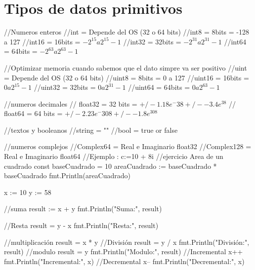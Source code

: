 \documentclass{article}
\begin{document}
\section{Tipos de datos primitivos} 
//Numeros enteros
//int = Depende del OS (32 o 64 bits)
//int8 = 8bits = -128 a 127
//int16 = 16bits = $-2^15 a 2^15-1$
//int32 = 32bits = $-2^31 a 2^31-1$
//int64 = 64bits = $-2^63 a 2^63-1$

//Optimizar memoria cuando sabemos que el dato simpre va ser positivo
//uint = Depende del OS (32 o 64 bits)
//uint8 = 8bits = 0 a 127
//uint16 = 16bits = $0 a 2^15-1$
//uint32 = 32bits = $0 a 2^31-1$
//uint64 = 64bits = $0 a 2^63-1$

//numeros decimales
// float32 = 32 bits = $+/- 1.18e^-38 +/- -3.4e^38$
// float64 = 64 bits = $+/- 2.23e^-308 +/- -1.8e^308$

//textos y booleanos
//string = ""
//bool = true or false

//numeros complejos
//Complex64 = Real e Imaginario float32
//Complex128 = Real e Imaginario float64
//Ejemplo : c:=10 + 8i
//ejercicio Area de un cuadrado
	const baseCuadrado = 10
	areaCuadrado := baseCuadrado * baseCuadrado
	fmt.Println(areaCuadrado)

	x := 10
	y := 58

	//suma
	result := x + y
	fmt.Println("Suma:", result)

	//Resta
	result = y - x
	fmt.Println("Resta:", result)

	//multiplicación
	result = x * y
	//División
	result = y / x
	fmt.Println("División:", result)
	//modulo
	result = y %
	fmt.Println("Modulo:", result)
	//Incremental
	x++
	fmt.Println("Incremental:", x)
	//Decremental
	x--
	fmt.Println("Decremental:", x)
\end{document}
